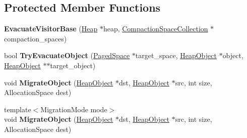 \subsection*{Protected Member Functions}
\begin{DoxyCompactItemize}
\item 
{\bfseries Evacuate\+Visitor\+Base} (\hyperlink{classv8_1_1internal_1_1_heap}{Heap} $\ast$heap, \hyperlink{classv8_1_1internal_1_1_compaction_space_collection}{Compaction\+Space\+Collection} $\ast$compaction\+\_\+spaces)\hypertarget{classv8_1_1internal_1_1_mark_compact_collector_1_1_evacuate_visitor_base_a66742d1b370a2ecbe3b3840ca96aa1c5}{}\label{classv8_1_1internal_1_1_mark_compact_collector_1_1_evacuate_visitor_base_a66742d1b370a2ecbe3b3840ca96aa1c5}

\item 
bool {\bfseries Try\+Evacuate\+Object} (\hyperlink{classv8_1_1internal_1_1_paged_space}{Paged\+Space} $\ast$target\+\_\+space, \hyperlink{classv8_1_1internal_1_1_heap_object}{Heap\+Object} $\ast$object, \hyperlink{classv8_1_1internal_1_1_heap_object}{Heap\+Object} $\ast$$\ast$target\+\_\+object)\hypertarget{classv8_1_1internal_1_1_mark_compact_collector_1_1_evacuate_visitor_base_ab183f4a0b4612be474815244bbd86509}{}\label{classv8_1_1internal_1_1_mark_compact_collector_1_1_evacuate_visitor_base_ab183f4a0b4612be474815244bbd86509}

\item 
void {\bfseries Migrate\+Object} (\hyperlink{classv8_1_1internal_1_1_heap_object}{Heap\+Object} $\ast$dst, \hyperlink{classv8_1_1internal_1_1_heap_object}{Heap\+Object} $\ast$src, int size, Allocation\+Space dest)\hypertarget{classv8_1_1internal_1_1_mark_compact_collector_1_1_evacuate_visitor_base_a3d5f5c87df5e60dc3012d89fb31f07fa}{}\label{classv8_1_1internal_1_1_mark_compact_collector_1_1_evacuate_visitor_base_a3d5f5c87df5e60dc3012d89fb31f07fa}

\item 
{\footnotesize template$<$Migration\+Mode mode$>$ }\\void {\bfseries Migrate\+Object} (\hyperlink{classv8_1_1internal_1_1_heap_object}{Heap\+Object} $\ast$dst, \hyperlink{classv8_1_1internal_1_1_heap_object}{Heap\+Object} $\ast$src, int size, Allocation\+Space dest)\hypertarget{classv8_1_1internal_1_1_mark_compact_collector_1_1_evacuate_visitor_base_a60736ada252d42c033d7ee8132e074da}{}\label{classv8_1_1internal_1_1_mark_compact_collector_1_1_evacuate_visitor_base_a60736ada252d42c033d7ee8132e074da}

\end{DoxyCompactItemize}
